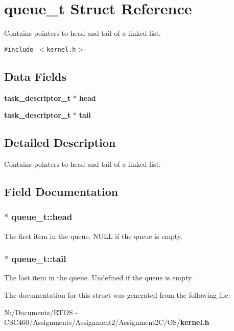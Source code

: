 \section{queue\_\-t Struct Reference}
\label{structqueue__t}
Contains pointers to head and tail of a linked list.  


{\tt \#include $<$kernel.h$>$}

\subsection*{Data Fields}
\begin{CompactItemize}
\item 
{\bf task\_\-descriptor\_\-t} $\ast$ {\bf head}
\item 
{\bf task\_\-descriptor\_\-t} $\ast$ {\bf tail}
\end{CompactItemize}


\subsection{Detailed Description}
Contains pointers to head and tail of a linked list. 



\subsection{Field Documentation}
\subsubsection{$\ast$ {\bf queue\_\-t::head}}\label{structqueue__t_92e5add0d75a7d614522bb391a11c6bf}


The first item in the queue. NULL if the queue is empty. 
\subsubsection{$\ast$ {\bf queue\_\-t::tail}}\label{structqueue__t_12a0d4acface8949f2a1e58fd45db805}


The last item in the queue. Undefined if the queue is empty. 

The documentation for this struct was generated from the following file:\begin{CompactItemize}
\item 
N:/Documents/RTOS - CSC460/Assignments/Assignment2/Assignment2C/OS/{\bf kernel.h}\end{CompactItemize}
